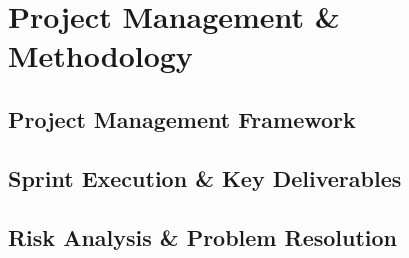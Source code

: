 \chapter{Project Management \& Methodology}
\label{chap:project_management}

\section{Project Management Framework}

\section{Sprint Execution \& Key Deliverables}

\section{Risk Analysis \& Problem Resolution}
